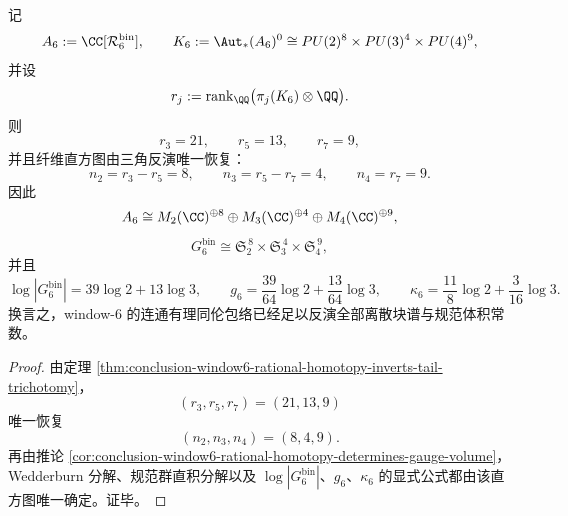 \begin{theorem}\label{thm:conclusion-window6-rational-envelope-reconstructs-block-spectrum}
记
\[
A_6:=\CC[\mathcal R_6^{\mathrm{bin}}],
\qquad
K_6:=\Aut_\ast(A_6)^0
\cong
PU(2)^8\times PU(3)^4\times PU(4)^9,
\]
并设
\[
r_j:=\operatorname{rank}_{\QQ}\bigl(\pi_j(K_6)\otimes\QQ\bigr).
\]
则
\[
r_3=21,\qquad r_5=13,\qquad r_7=9,
\]
并且纤维直方图由三角反演唯一恢复：
\[
n_2=r_3-r_5=8,
\qquad
n_3=r_5-r_7=4,
\qquad
n_4=r_7=9.
\]
因此
\[
A_6\cong M_2(\CC)^{\oplus 8}\oplus M_3(\CC)^{\oplus 4}\oplus M_4(\CC)^{\oplus 9},
\]
\[
G_6^{\mathrm{bin}}\cong \mathfrak S_2^{\,8}\times \mathfrak S_3^{\,4}\times \mathfrak S_4^{\,9},
\]
并且
\[
\log |G_6^{\mathrm{bin}}|=39\log 2+13\log 3,
\qquad
g_6=\frac{39}{64}\log 2+\frac{13}{64}\log 3,
\qquad
\kappa_6=\frac{11}{8}\log 2+\frac{3}{16}\log 3.
\]
换言之，window-\(6\) 的连通有理同伦包络已经足以反演全部离散块谱与规范体积常数。
\end{theorem}
\begin{proof}
由定理 \ref{thm:conclusion-window6-rational-homotopy-inverts-tail-trichotomy}，
\[
(r_3,r_5,r_7)=(21,13,9)
\]
唯一恢复
\[
(n_2,n_3,n_4)=(8,4,9).
\]
再由推论 \ref{cor:conclusion-window6-rational-homotopy-determines-gauge-volume}，Wedderburn 分解、规范群直积分解以及 \(\log|G_6^{\mathrm{bin}}|\)、\(g_6\)、\(\kappa_6\) 的显式公式都由该直方图唯一确定。证毕。
\end{proof}

